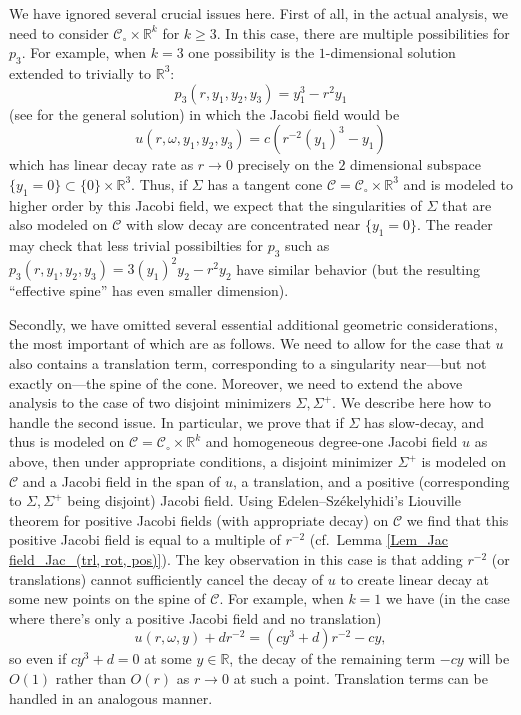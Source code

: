 \documentclass[11pt, letterpaper, reqno]{amsart}
\numberwithin{equation}{section}
\theoremstyle{remark}
\newcommand{\RR}{\mathbb{R}}
\newcommand{\cC}{\mathcal{C}}
\begin{document}
We have ignored several crucial issues here. First of all, in the actual analysis, we need to consider $\cC_\circ\times \RR^k$ for $k\geq 3$. In this case, there are multiple possibilities for $p_{3}$. For example, when $k=3$ one possibility is the $1$-dimensional solution extended to trivially to $\RR^3$:
\[
p_3(r,y_1,y_2,y_3) =  y_1^3 -  r^2 y_1
\]
(see \cite[Section 3]{Simon:liouville} for the general solution) in which the Jacobi field would be
\[
u(r,\omega,y_1,y_2,y_3) = c(r^{-2}(y_1)^3-y_1)
\]
which has linear decay rate as $r\to0$ precisely on the $2$ dimensional subspace $\{y_1  =0\}\subset \{0\}\times \RR^3$. Thus, if $\Sigma$  has a tangent cone $\cC=\cC_\circ\times \RR^3$ and is modeled to higher order by this Jacobi field, we expect that the singularities of $\Sigma$ that are also modeled on $\cC$ with slow decay are concentrated near $\{y_1=0\}$. The reader may check that less trivial possibilties for $p_3$ such as $p_3(r,y_1,y_2,y_3) = 3 (y_1)^2 y_2 - r^2 y_2$ have similar behavior (but the resulting ``effective spine'' has  even smaller dimension). 

Secondly, we have omitted several essential additional geometric considerations, the most important of which are as follows. We need to allow for the case that  $u$  also contains a translation term, corresponding to a singularity near---but not exactly on---the spine of the cone. Moreover, we need to extend the above analysis to the case of two disjoint minimizers $\Sigma,\Sigma^+$. We describe here how to handle the second issue. In particular, we prove that if $\Sigma$ has slow-decay, and thus is modeled on $\cC = \cC_\circ\times \RR^k$ and homogeneous degree-one Jacobi field $u$ as above, then under appropriate conditions, a disjoint minimizer $\Sigma^+$ is modeled on $\cC$ and a Jacobi field in the span of $u$, a translation, and a positive (corresponding to $\Sigma,\Sigma^+$ being disjoint) Jacobi field. Using Edelen--Sz\'ekelyhidi's \cite{EdelenSzekelyhidi:liouville} Liouville theorem for positive Jacobi fields (with appropriate decay) on $\cC$ we find that this positive Jacobi field is equal to a multiple of $r^{-2}$ (cf.\ Lemma \ref{Lem_Jac field_Jac_(trl, rot, pos)}). The key observation in this case is that adding $r^{-2}$ (or translations) cannot sufficiently cancel the decay of $u$ to create linear decay at some new points on the spine of $\cC$. For example, when $k=1$ we have (in the case where there's only a positive Jacobi field and no translation)
\[
u(r,\omega,y)+dr^{-2} = (cy^3+d)r^{-2} - c y,
\]
so even if $cy^3+d=0$ at some $y\in\RR$, the decay of the remaining term $-cy$ will be $O(1)$ rather than $O(r)$ as $r\to 0$ at such a point. Translation terms can be handled in an analogous manner. 
\end{document}
